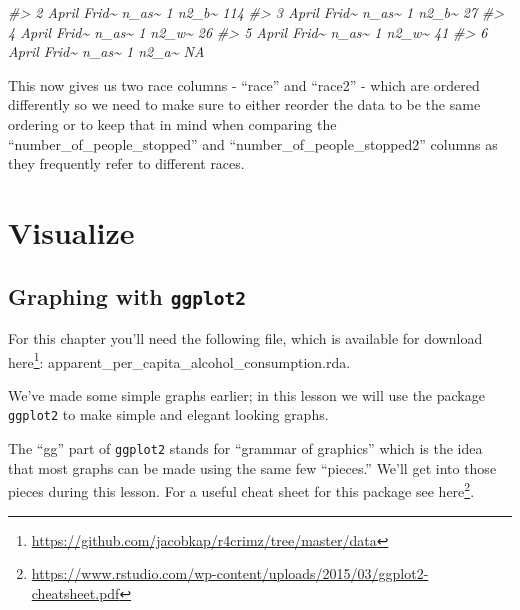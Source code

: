 \documentclass[
]{krantz}
\makeatletter
\newenvironment{Shaded}{\begin{snugshade}}{\end{snugshade}}
\newcommand{\CommentTok}[1]{\textcolor[rgb]{0.37,0.37,0.37}{\textit{#1}}}
\renewcommand{\href}[2]{#2\footnote{\url{#1}}}
\newenvironment{kframe}{%
\medskip{}
\setlength{\fboxsep}{.8em}
 \def\at@end@of@kframe{}%
 \ifinner\ifhmode%
  \def\at@end@of@kframe{\end{minipage}}%
  \begin{minipage}{\columnwidth}%
 \fi\fi%
 \def\FrameCommand##1{\hskip\@totalleftmargin \hskip-\fboxsep
 \colorbox{shadecolor}{##1}\hskip-\fboxsep
     \hskip-\linewidth \hskip-\@totalleftmargin \hskip\columnwidth}%
 \MakeFramed {\advance\hsize-\width
   \@totalleftmargin\z@ \linewidth\hsize
   \@setminipage}}%
 {\par\unskip\endMakeFramed%
 \at@end@of@kframe}
\renewenvironment{Shaded}{\begin{kframe}}{\end{kframe}}
\makeatother
\begin{document}
\begin{Shaded}
\begin{Highlighting}[]
\CommentTok{\#\textgreater{} 2 April  Frid\textasciitilde{} n\_as\textasciitilde{}                1 n2\_b\textasciitilde{}              114}
\CommentTok{\#\textgreater{} 3 April  Frid\textasciitilde{} n\_as\textasciitilde{}                1 n2\_b\textasciitilde{}               27}
\CommentTok{\#\textgreater{} 4 April  Frid\textasciitilde{} n\_as\textasciitilde{}                1 n2\_w\textasciitilde{}               26}
\CommentTok{\#\textgreater{} 5 April  Frid\textasciitilde{} n\_as\textasciitilde{}                1 n2\_w\textasciitilde{}               41}
\CommentTok{\#\textgreater{} 6 April  Frid\textasciitilde{} n\_as\textasciitilde{}                1 n2\_a\textasciitilde{}               NA}
\end{Highlighting}
\end{Shaded}

This now gives us two race columns - ``race'' and ``race2''
- which are ordered differently so we need to make sure to
either reorder the data to be the same ordering or to keep
that in mind when comparing the
``number\_of\_people\_stopped'' and
``number\_of\_people\_stopped2'' columns as they frequently
refer to different races.

\hypertarget{part-visualize}{%
\part{Visualize}\label{part-visualize}}

\hypertarget{graphing-intro}{%
\chapter{\texorpdfstring{Graphing with
\texttt{ggplot2}}{Graphing with ggplot2}}\label{graphing-intro}}

For this chapter you'll need the following file, which is
available for download
\href{https://github.com/jacobkap/r4crimz/tree/master/data}{here}:
apparent\_per\_capita\_alcohol\_consumption.rda.

We've made some simple graphs earlier; in this lesson we
will use the package \texttt{ggplot2} to make simple and
elegant looking graphs.

The ``gg'' part of \texttt{ggplot2} stands for ``grammar of
graphics'' which is the idea that most graphs can be made
using the same few ``pieces.'' We'll get into those pieces
during this lesson. For a useful cheat sheet for this
package see
\href{https://www.rstudio.com/wp-content/uploads/2015/03/ggplot2-cheatsheet.pdf}{here}.
\end{document}

